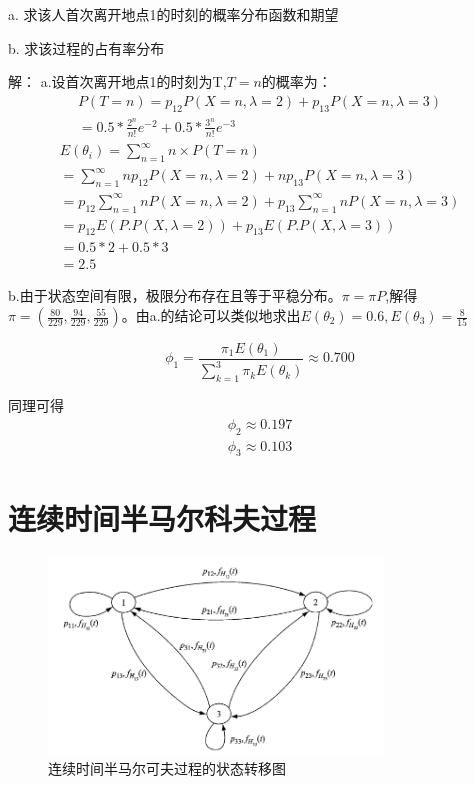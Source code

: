 \documentclass[UTF8]{ctexart}
\begin{document}
a. 求该人首次离开地点1的时刻的概率分布函数和期望

b. 求该过程的占有率分布

解： a.设首次离开地点1的时刻为T,$T=n$的概率为：
$$\begin{aligned}
P(T=n)=p_{12}P(X=n,\lambda=2)+p_{13}P(X=n,\lambda=3)\\
=0.5*\frac{2^n}{n!}e^{-2}+0.5*\frac{3^n}{n!}e^{-3}
\end{aligned}$$
$$\begin{aligned}
E(\theta_i)=\sum_{n=1}^\infty n\times P(T=n)\\
=\sum_{n=1}^\infty np_{12}P(X=n,\lambda=2)+np_{13}P(X=n,\lambda=3)\\
=p_{12}\sum_{n=1}^\infty nP(X=n,\lambda=2)+p_{13}\sum_{n=1}^\infty nP(X=n,\lambda=3)\\
=p_{12}E(P.P(X,\lambda=2))+p_{13}E(P.P(X,\lambda=3))\\
=0.5*2+0.5*3\\
=2.5
\end{aligned}$$

b.由于状态空间有限，极限分布存在且等于平稳分布。$\pi=\pi P$,解得$\pi=(\frac{80}{229},\frac{94}{229},\frac{55}{229})$。由a.的结论可以类似地求出$E(\theta_2)=0.6,E(\theta_3)=\frac{8}{15}$

$$
\phi_1=\frac{\pi_1E(\theta_1)}{\sum_{k=1}^3 \pi_kE(\theta_k)} \approx 0.700
$$

同理可得
$$\begin{aligned}\phi_2\approx 0.197\\
\phi_3\approx 0.103\end{aligned}
$$
\section{连续时间半马尔科夫过程}
\begin{figure}[htbp]
\centering\includegraphics[width=3.5in]{f62}
\caption{连续时间半马尔可夫过程的状态转移图}\label{fig:2}
\end{figure}
\end{document}

